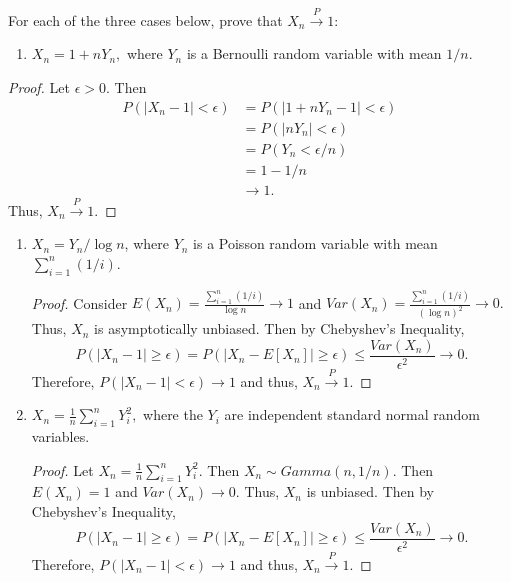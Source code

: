 \documentclass[12pt,]{article}
\providecommand{\tightlist}{%
  \setlength{\itemsep}{0pt}\setlength{\parskip}{0pt}}
\begin{document}
For each of the three cases below, prove that
\(X_n\overset{P}\rightarrow 1:\)

\begin{enumerate}
\def\labelenumi{(\alph{enumi})}
\tightlist
\item
  \(X_n=1+nY_n,\) where \(Y_n\) is a Bernoulli random variable with mean
  \(1/n.\)
\end{enumerate}

\begin{proof}
Let $\epsilon>0$. Then 
\begin{align*}
P(|X_n -1|<\epsilon) & = P(|1+nY_n-1|<\epsilon)\\
& = P(|nY_n|<\epsilon)\\
& = P(Y_n < \epsilon/n)\\
& = 1 - 1/n\\
& \rightarrow 1.
\end{align*}
Thus, $X_n\overset{P}\rightarrow 1.$
\end{proof}

\begin{enumerate}
\def\labelenumi{(\alph{enumi})}
\setcounter{enumi}{1}
\tightlist
\item
  \(X_n = Y_n/\log n\), where \(Y_n\) is a Poisson random variable with
  mean \(\sum_{i=1}^n(1/i)\).

  \begin{proof}
  Consider $E(X_n) = \frac{\sum_{i=1}^n(1/i)}{\log n} \rightarrow 1$ and $Var(X_n) = \frac{\sum_{i=1}^n(1/i)}{(\log n)^2}\rightarrow 0.$ Thus, $X_n$ is asymptotically unbiased. Then by Chebyshev's Inequality,
  $$P(|X_n-1|\ge\epsilon) = P(|X_n-E[X_n]|\ge\epsilon) \le \frac{Var(X_n)}{\epsilon^2}\rightarrow 0.$$ Therefore, $P(|X_n-1|<\epsilon) \rightarrow 1$ and thus, $X_n\overset{P}\rightarrow 1.$
  \end{proof}
\item
  \(X_n = \frac{1}{n}\sum_{i=1}^n Y_i^2,\) where the \(Y_i\) are
  independent standard normal random variables.

  \begin{proof}
  Let $X_n = \frac{1}{n}\sum_{i=1}^n Y_i^2.$ Then $X_n \sim  Gamma(n, 1/n).$ Then $E(X_n) = 1$ and $Var(X_n) \rightarrow 0.$ Thus, $X_n$ is unbiased. Then by Chebyshev's Inequality,
  $$P(|X_n-1|\ge\epsilon) = P(|X_n-E[X_n]|\ge\epsilon) \le \frac{Var(X_n)}{\epsilon^2}\rightarrow 0.$$ Therefore, $P(|X_n-1|<\epsilon) \rightarrow 1$ and thus, $X_n\overset{P}\rightarrow 1.$
  \end{proof}
\end{enumerate}
\end{document}

